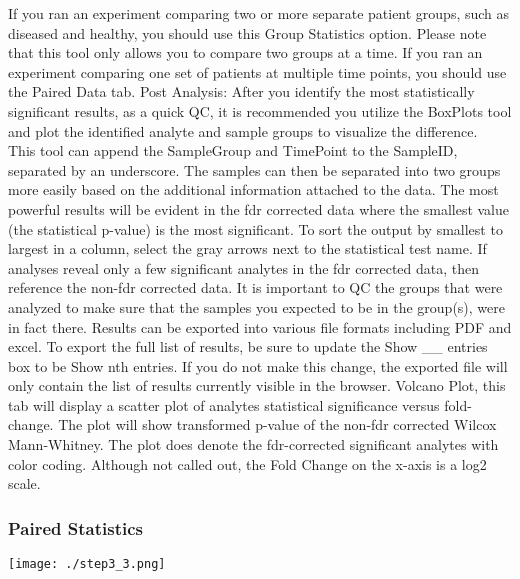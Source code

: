 \documentclass[]{article}
\begin{document}
If you ran an experiment comparing two or more separate patient groups,
such as diseased and healthy, you should use this Group Statistics
option. Please note that this tool only allows you to compare two groups
at a time. If you ran an experiment comparing one set of patients at
multiple time points, you should use the Paired Data tab. Post Analysis:
After you identify the most statistically significant results, as a
quick QC, it is recommended you utilize the BoxPlots tool and plot the
identified analyte and sample groups to visualize the difference.\\
This tool can append the SampleGroup and TimePoint to the SampleID,
separated by an underscore. The samples can then be separated into two
groups more easily based on the additional information attached to the
data. The most powerful results will be evident in the fdr corrected
data where the smallest value (the statistical p-value) is the most
significant. To sort the output by smallest to largest in a column,
select the gray arrows next to the statistical test name. If analyses
reveal only a few significant analytes in the fdr corrected data, then
reference the non-fdr corrected data. It is important to QC the groups
that were analyzed to make sure that the samples you expected to be in
the group(s), were in fact there. Results can be exported into various
file formats including PDF and excel. To export the full list of
results, be sure to update the Show \_\_ entries box to be Show nth
entries. If you do not make this change, the exported file will only
contain the list of results currently visible in the browser. Volcano
Plot, this tab will display a scatter plot of analytes statistical
significance versus fold-change. The plot will show transformed p-value
of the non-fdr corrected Wilcox Mann-Whitney. The plot does denote the
fdr-corrected significant analytes with color coding. Although not
called out, the Fold Change on the x-axis is a log2 scale.

\newpage

\hypertarget{paired-statistics}{%
\subsubsection{Paired Statistics}\label{paired-statistics}}

\texttt{[image: ./step3\_3.png]}
\end{document}
